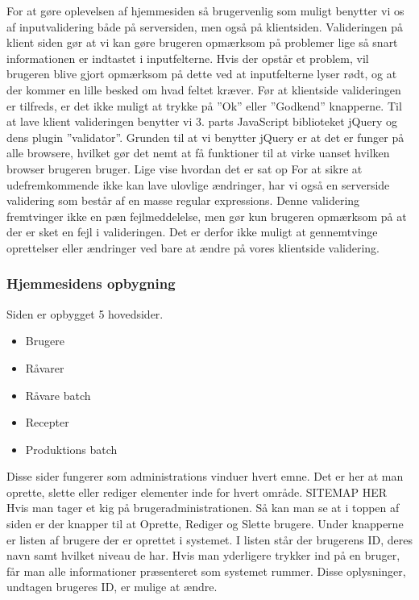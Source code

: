 \documentclass[a4paper]{article}
\begin{document}
For at gøre oplevelsen af hjemmesiden så brugervenlig som muligt benytter vi os af inputvalidering både på serversiden, men også på klientsiden. Valideringen på klient siden gør at vi kan gøre brugeren opmærksom på problemer lige så snart informationen er indtastet i inputfelterne. Hvis der opstår et problem, vil brugeren blive gjort opmærksom på dette ved at inputfelterne lyser rødt, og at der kommer en lille besked om hvad feltet kræver.  Før at klientside valideringen er tilfreds, er det ikke muligt at trykke på ”Ok” eller ”Godkend” knapperne.  
Til at lave klient valideringen benytter vi 3. parts JavaScript biblioteket  jQuery  og dens plugin ”validator”. Grunden til at vi benytter jQuery er at det er funger på alle browsere, hvilket gør det nemt at få funktioner til at virke uanset hvilken browser brugeren bruger. 
Lige vise hvordan det er sat op
For at sikre at udefremkommende ikke kan lave ulovlige ændringer, har vi også en serverside validering som består af en masse regular expressions. Denne validering fremtvinger ikke en pæn fejlmeddelelse, men gør kun brugeren opmærksom på at der er sket en fejl i valideringen. Det er derfor ikke muligt at gennemtvinge oprettelser eller ændringer ved bare at ændre på vores klientside validering. 


\subsubsection{Hjemmesidens opbygning} %

Siden er opbygget 5 hovedsider. 
\begin{itemize}
  \item Brugere
  \item Råvarer
  \item Råvare batch
  \item Recepter
  \item Produktions batch
\end{itemize}

Disse sider fungerer som administrations vinduer hvert emne.  Det er her at man oprette, slette eller rediger elementer inde for hvert område. 
SITEMAP HER
Hvis man tager et kig på brugeradministrationen. Så kan man se at i toppen af siden er der knapper til at Oprette, Rediger og Slette brugere. Under knapperne er listen af brugere der er oprettet i systemet. I listen står der brugerens ID, deres navn samt hvilket niveau de har. Hvis man yderligere trykker ind på en bruger, får man alle informationer præsenteret som systemet rummer.  Disse oplysninger, undtagen brugeres ID, er mulige at ændre. 
\end{document}

